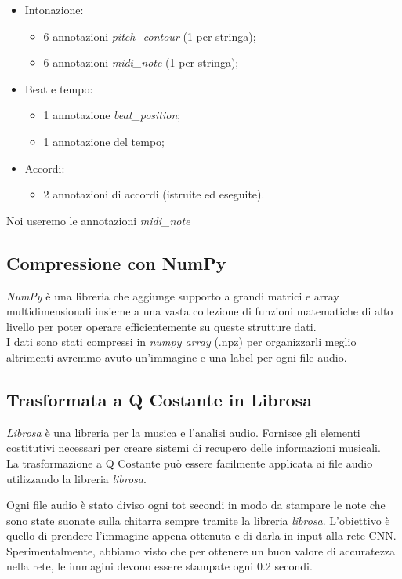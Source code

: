 \begin{itemize}
	\item Intonazione:
	\begin{itemize}
		\item 6 annotazioni \textit{pitch\_contour} (1 per stringa);
		\item 6 annotazioni \textit{midi\_note} (1 per stringa);
	\end{itemize}
	\item Beat e tempo:
	\begin{itemize}
		\item 1 annotazione \textit{beat\_position};
		\item 1 annotazione del tempo;
	\end{itemize}
	\item Accordi:
	\begin{itemize}
		\item 2 annotazioni di accordi (istruite ed eseguite).
	\end{itemize}
\end{itemize}
Noi useremo le annotazioni \textit{midi\_note}
\subsection{Compressione con NumPy}
\textit{NumPy} è una libreria che aggiunge supporto a grandi matrici e array multidimensionali insieme a una vasta collezione di funzioni matematiche di alto livello per poter operare efficientemente su queste strutture dati.\\
\newline
I dati sono stati compressi in \textit{numpy array} (.npz) per organizzarli meglio altrimenti avremmo avuto un'immagine e una label per ogni file audio.

\subsection{Trasformata a Q Costante in Librosa}
\textit{Librosa} è una libreria per la musica e l'analisi audio. Fornisce gli elementi costitutivi necessari per creare sistemi di recupero delle informazioni musicali.\\
\newline
La trasformazione a Q Costante può essere facilmente applicata ai file audio utilizzando la libreria \textit{librosa}.

Ogni file audio è stato diviso ogni tot secondi in modo da stampare le note che sono state suonate sulla chitarra sempre tramite la libreria \textit{librosa}. L'obiettivo è quello di prendere l'immagine appena ottenuta e di darla in input alla rete CNN. Sperimentalmente, abbiamo visto che per ottenere un buon valore di accuratezza nella rete, le immagini devono essere stampate ogni 0.2 secondi.

